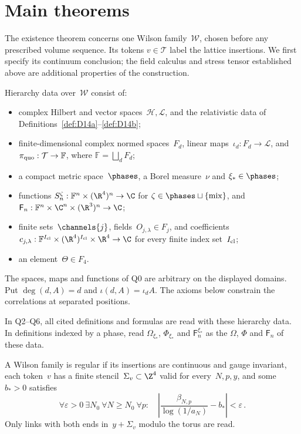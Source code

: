\section{Main theorems}\label{sec:main-theorems}

The existence theorem concerns one Wilson family~$\mathcal W$, chosen before any prescribed volume sequence. Its tokens $v\in\mathcal T$ label the lattice insertions. We first specify its continuum conclusion; the field calculus and stress tensor established above are additional properties of the construction.

\begin{definition}\label{def:Q0}
Hierarchy data over~$\mathcal W$ consist of:
\begin{itemize}[nosep]
\item complex Hilbert and vector spaces~$\mathcal H,\mathcal L$, and the relativistic data of Definitions~\ref{def:D14a}--\ref{def:D14b};
\item finite-dimensional complex normed spaces~$F_d$, linear maps~$\iota_d:F_d\to\mathcal L$, and $\pi_{\rm quo}:\mathcal T\to\mathbb F$, where $\mathbb F=\bigsqcup_dF_d$;
\item a compact metric space~$\phases$, a Borel measure~$\nu$ and $\xi_*\in\phases$;
\item functions $S_n^\zeta:\mathbb F^n\times(\R^4)^n\to\C$ for $\zeta\in\phases\sqcup\{\mathrm{mix}\}$, and $\mathsf F_n:\mathbb F^n\times\C^n\times(\R^3)^n\to\C$;
\item finite sets~$\channels{j}$, fields~$O_{j,\lambda}\in F_j$, and coefficients $c_{j,\lambda}:\mathbb F^{I_{\rm cl}}\times(\R^4)^{I_{\rm cl}}\times\R^4\to\C$ for every finite index set~$I_{\rm cl}$;
\item an element~$\Theta\in F_4$.
\end{itemize}
\end{definition}

The spaces, maps and functions of Q0 are arbitrary on the displayed domains. Put $\deg(d,A)=d$ and $\iota(d,A)=\iota_dA$. The axioms below constrain the correlations at separated positions.

In Q2--Q6, all cited definitions and formulas are read with these hierarchy data. In definitions indexed by a phase, read $\Omega_{\xi_*}$, $\Phi_{\xi_*}$ and $\mathsf F_n^{\xi_*}$ as the $\Omega$, $\Phi$ and $\mathsf F_n$ of these data.

\begin{definition}\label{def:Q1}
A Wilson family is regular if its insertions are continuous and gauge invariant, each token~$v$ has a finite stencil~$\Sigma_v\subset\Z^4$ valid for every~$N,p,y$, and some~$b_*>0$ satisfies
\begin{equation*}
\forall\varepsilon>0\ \exists N_0\ \forall N\ge N_0\ \forall p:\quad
\left|\frac{\beta_{N,p}}{\log(1/a_N)}-b_*\right|<\varepsilon\,.
\end{equation*}
Only links with both ends in~$y+\Sigma_v$ modulo the torus are read.
\end{definition}

